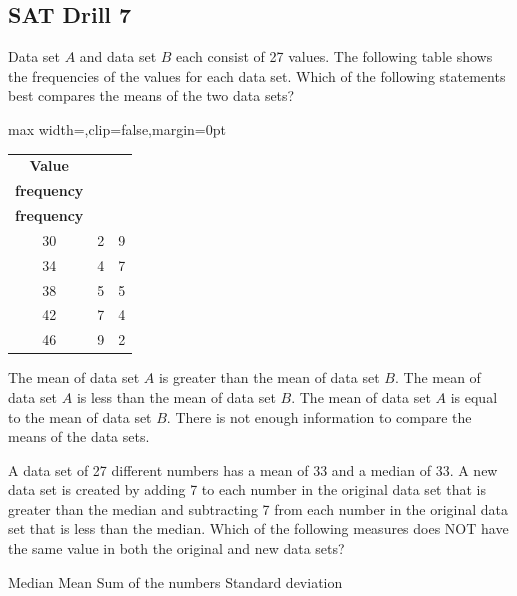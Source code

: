 
\subsection*{SAT Drill 7}

\question[1]
Data set $A$ and data set $B$ each consist of 27 values. The following table shows the frequencies of the values for each data set. Which of the following statements best compares the means of the two data sets?
\begin{center}
  \renewcommand{\arraystretch}{1.3}
  \setlength{\tabcolsep}{0.5em}
  \label{tab:sat-drill-07-freq-datasets-ab}%
  \vspace{0.35em}
  \begin{adjustbox}{max width=\linewidth,clip=false,margin=0pt}
  \begin{tabular}{|c|c|c|} 
    \hline
    \cellcolor[HTML]{E0E0E0}\textbf{Value} &
    \cellcolor[HTML]{E0E0E0}\makecell{\textbf{Data set A}\\\textbf{frequency}} &
    \cellcolor[HTML]{E0E0E0}\makecell{\textbf{Data set B}\\\textbf{frequency}} \\
    \hline
    30 & 2 & 9 \\
    \hline
    34 & 4 & 7 \\
    \hline
    38 & 5 & 5 \\
    \hline
    42 & 7 & 4 \\
    \hline
    46 & 9 & 2 \\
    \hline
  \end{tabular}
  \end{adjustbox}
\end{center}
\begin{choices}
  \choice The mean of data set $A$ is greater than the mean of data set $B$.
  \choice The mean of data set $A$ is less than the mean of data set $B$.
  \CorrectChoice The mean of data set $A$ is equal to the mean of data set $B$.
  \choice There is not enough information to compare the means of the data sets.
\end{choices}

\question[1]
A data set of 27 different numbers has a mean of 33 and a median of 33. A new data set is created by adding 7 to each number in the original data set that is greater than the median and subtracting 7 from each number in the original data set that is less than the median. Which of the following measures does NOT have the same value in both the original and new data sets?
\begin{choices} 
  \choice Median
  \choice Mean
  \choice Sum of the numbers
  \CorrectChoice Standard deviation
\end{choices}


